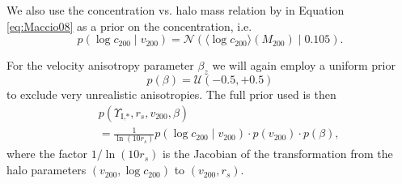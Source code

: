 We also use the concentration vs. halo mass relation by \citet{Maccio08} in Equation \eqref{eq:Maccio08} as a prior on the concentration, i.e.
\begin{equation*}
p(\log c_{200} \mid v_{200}) = \mathscr{N}\left(\langle \log c_{200} \rangle (M_{200}) \mid 0.105 \right).
\end{equation*}

For the velocity anisotropy parameter $\beta_z$ we will again employ a uniform prior 
\begin{equation*}
p(\beta) = \mathscr{U}(-0.5,+0.5)
\end{equation*}
to exclude very unrealistic anisotropies. The full prior used is then
\begin{eqnarray*}
&&p(\Upsilon_\text{I,*},r_s,v_{200},\beta) \\
&&= \frac{1}{\ln\left( 10 r_s\right)} p(\log c_{200} \mid v_{200}) \cdot p(v_{200}) \cdot p(\beta), 
\end{eqnarray*}
where the factor $1/\ln\left( 10 r_s\right)$ is the Jacobian of the transformation from the halo parameters $(v_{200},\log c_{200})$ to $(v_{200},r_s)$.

